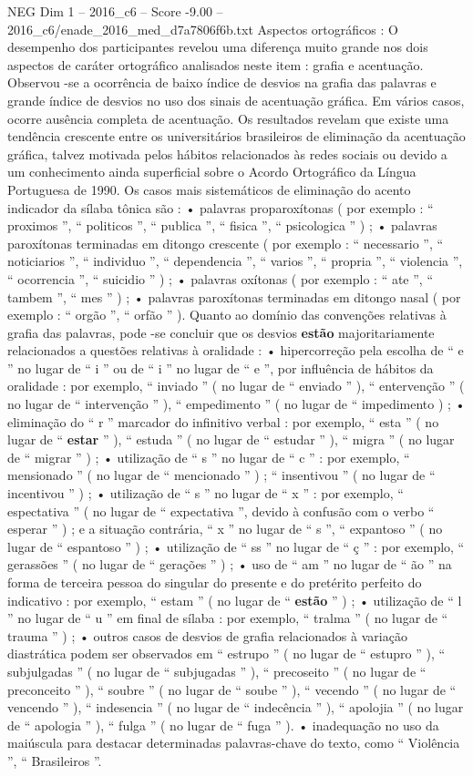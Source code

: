 \begin{textsample}{NEG Dim 1 – 2016\_c6 – Score -9.00 – 2016\_c6/enade\_2016\_med\_d7a7806f6b.txt}
Aspectos ortográficos : O desempenho dos participantes revelou uma diferença muito grande nos dois aspectos de caráter ortográfico analisados neste item : grafia e acentuação.
Observou -se a ocorrência de baixo índice de desvios na grafia das palavras e grande índice de desvios no uso dos sinais de acentuação gráfica.
Em vários casos, ocorre ausência completa de acentuação.
Os resultados revelam que existe uma tendência crescente entre os universitários brasileiros de eliminação da acentuação gráfica, talvez motivada pelos hábitos relacionados às redes sociais ou devido a um conhecimento ainda superficial sobre o Acordo Ortográfico da Língua Portuguesa de 1990.
Os casos mais sistemáticos de eliminação do acento indicador da sílaba tônica são : • palavras proparoxítonas ( por exemplo : “ proximos ”, “ politicos ”, “ publica ”, “ fisica ”, “ psicologica ” ) ; • palavras paroxítonas terminadas em ditongo crescente ( por exemplo : “ necessario ”, “ noticiarios ”, “ individuo ”, “ dependencia ”, “ varios ”, “ propria ”, “ violencia ”, “ ocorrencia ”, “ suicidio ” ) ; • palavras oxítonas ( por exemplo : “ ate ”, “ tambem ”, “ mes ” ) ; • palavras paroxítonas terminadas em ditongo nasal ( por exemplo : “ orgão ”, “ orfão ” ).
Quanto ao domínio das convenções relativas à grafia das palavras, pode -se concluir que os desvios \textbf{estão} majoritariamente relacionados a questões relativas à oralidade : • hipercorreção pela escolha de “ e ” no lugar de “ i ” ou de “ i ” no lugar de “ e ”, por influência de hábitos da oralidade : por exemplo, “ inviado ” ( no lugar de “ enviado ” ), “ entervenção ” ( no lugar de “ intervenção ” ), “ empedimento ” ( no lugar de “ impedimento ) ; • eliminação do “ r ” marcador do infinitivo verbal : por exemplo, “ esta ” ( no lugar de “ \textbf{estar} ” ), “ estuda ” ( no lugar de “ estudar ” ), “ migra ” ( no lugar de “ migrar ” ) ; • utilização de “ s ” no lugar de “ c ” : por exemplo, “ mensionado ” ( no lugar de “ mencionado ” ) ; “ insentivou ” ( no lugar de “ incentivou ” ) ; • utilização de “ s ” no lugar de “ x ” : por exemplo, “ espectativa ” ( no lugar de “ expectativa ”, devido à confusão com o verbo “ esperar ” ) ; e a situação contrária, “ x ” no lugar de “ s ”, “ expantoso ” ( no lugar de “ espantoso ” ) ; • utilização de “ ss ” no lugar de “ ç ” : por exemplo, “ gerassões ” ( no lugar de “ gerações ” ) ; • uso de “ am ” no lugar de “ ão ” na forma de terceira pessoa do singular do presente e do pretérito perfeito do indicativo : por exemplo, “ estam ” ( no lugar de “ \textbf{estão} ” ) ; • utilização de “ l ” no lugar de “ u ” em final de sílaba : por exemplo, “ tralma ” ( no lugar de “ trauma ” ) ; • outros casos de desvios de grafia relacionados à variação diastrática podem ser observados em “ estrupo ” ( no lugar de “ estupro ” ), “ subjulgadas ” ( no lugar de “ subjugadas ” ), “ precoseito ” ( no lugar de “ preconceito ” ), “ soubre ” ( no lugar de “ soube ” ), “ vecendo ” ( no lugar de “ vencendo ” ), “ indesencia ” ( no lugar de “ indecência ” ), “ apolojia ” ( no lugar de “ apologia ” ), “ fulga ” ( no lugar de “ fuga ” ). • inadequação no uso da maiúscula para destacar determinadas palavras-chave do texto, como “ Violência ”, “ Brasileiros ”.

\end{textsample}
